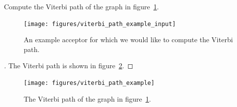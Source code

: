 \begin{example}
Compute the Viterbi path of the graph in
figure~\ref{fig:viterbi_path_example_input}.
\end{example}

\begin{figure}
    \centering
    \texttt{[image: figures/viterbi\_path\_example\_input]}
    \caption{An example acceptor for which we would like to compute the Viterbi
    path.}
    \label{fig:viterbi_path_example_input}
\end{figure}

\begin{proof}[\unskip\nopunct]
The Viterbi path is shown in  figure~\ref{fig:viterbi_path_example}.
\end{proof}

\begin{figure}
    \centering
    \texttt{[image: figures/viterbi\_path\_example]}
    \caption{The Viterbi path of the graph in
    figure~\ref{fig:viterbi_path_example_input}.}
    \label{fig:viterbi_path_example}
\end{figure}
